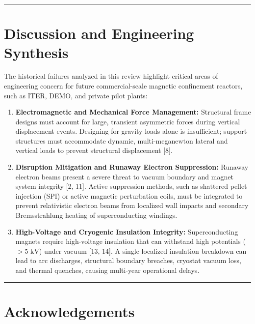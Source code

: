 \documentclass[11pt,a4paper]{article}
\begin{document}
\begin{center}\rule{0.5\linewidth}{0.5pt}\end{center}

\hypertarget{discussion-and-engineering-synthesis}{%
\section{Discussion and Engineering Synthesis}\label{discussion-and-engineering-synthesis}}

The historical failures analyzed in this review highlight critical areas of engineering concern for future commercial-scale magnetic confinement reactors, such as ITER, DEMO, and private pilot plants:

\begin{enumerate}
\def\labelenumi{\arabic{enumi}.}
\item
  \textbf{Electromagnetic and Mechanical Force Management:} Structural frame designs must account for large, transient asymmetric forces during vertical displacement events. Designing for gravity loads alone is insufficient; support structures must accommodate dynamic, multi-meganewton lateral and vertical loads to prevent structural displacement {[}8{]}.
\item
  \textbf{Disruption Mitigation and Runaway Electron Suppression:} Runaway electron beams present a severe threat to vacuum boundary and magnet system integrity {[}2, 11{]}. Active suppression methods, such as shattered pellet injection (SPI) or active magnetic perturbation coils, must be integrated to prevent relativistic electron beams from localized wall impacts and secondary Bremsstrahlung heating of superconducting windings.
\item
  \textbf{High-Voltage and Cryogenic Insulation Integrity:} Superconducting magnets require high-voltage insulation that can withstand high potentials (\(>5\text{ kV}\)) under vacuum {[}13, 14{]}. A single localized insulation breakdown can lead to arc discharges, structural boundary breaches, cryostat vacuum loss, and thermal quenches, causing multi-year operational delays.
\end{enumerate}

\begin{center}\rule{0.5\linewidth}{0.5pt}\end{center}

\hypertarget{acknowledgements}{%
\section{Acknowledgements}\label{acknowledgements}}
\end{document}
